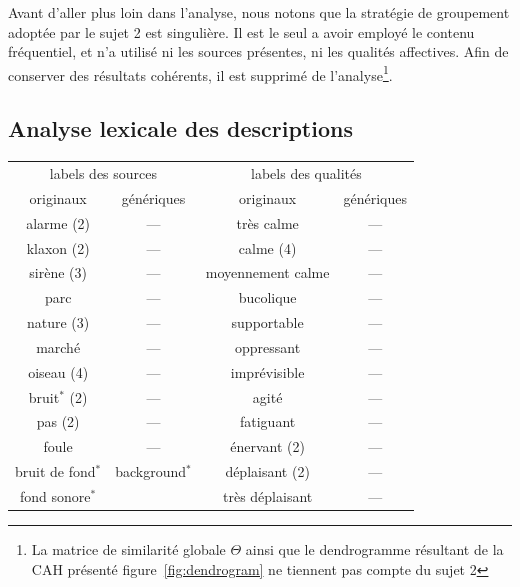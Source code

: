 Avant d'aller plus loin dans l'analyse, nous notons que la stratégie de groupement adoptée par le sujet 2 est singulière. Il est le seul a avoir employé le contenu fréquentiel, et n'a utilisé ni les sources présentes, ni les qualités affectives. Afin de conserver des résultats cohérents, il est supprimé de l'analyse\footnote{La matrice de similarité globale $\Theta$ ainsi que le dendrogramme résultant de la CAH présenté figure~\ref{fig:dendrogram} ne tiennent pas compte du sujet 2}. 

\subsection{Analyse lexicale des descriptions}
\label{sec:ch5_xp3AnalyseLexicale}

\begin{table}[t]
\centering
\tiny 
\begin{tabular}{cc|cc}
\multicolumn{2}{c|}{labels des sources}         & \multicolumn{2}{c}{labels des qualités}      \\
originaux             & génériques              & originaux & génériques       \\
\hline
alarme (2)            & ---                     &  très calme            & --- \\
klaxon  (2)           & ---                     &  calme (4)             & ---   \\ 
sirène (3)            & ---                     &  moyennement calme     & ---  \\ 
parc                  & ---                     &  bucolique             & ---   \\
nature (3)            & ---                     &  supportable           & ---  \\
marché                & ---                     &  oppressant            & ---\\
oiseau (4)            & ---                     &  imprévisible         & ---  \\ 
bruit$^*$ (2)         & ---                     &  agité                 & --- \\ 
pas (2)               & ---                     &  fatiguant             & --- \\
foule                 & ---                     &  énervant (2)          & --- \\
\cline{1-2}         
bruit de fond$^*$     & background$^*$          &  déplaisant (2)        & ---   \\ 
fond sonore$^*$       &                         &  très déplaisant       & ---    \\ 

\end{tabular}
\end{table}
